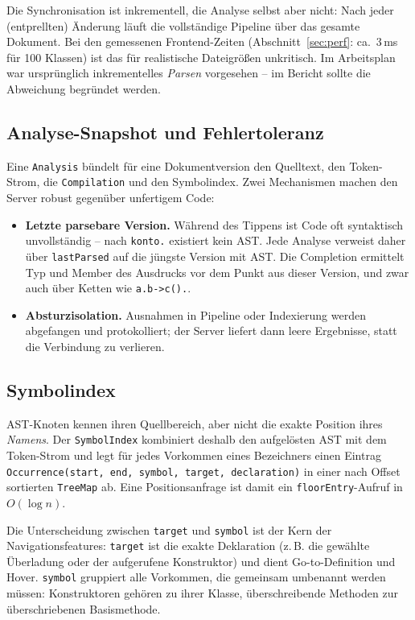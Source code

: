 \documentclass[11pt,a4paper,parskip=half,headsepline,toc=flat]{scrartcl}
\newcommand{\code}[1]{\texttt{#1}}
\begin{document}
\begin{hinweis}
Die Synchronisation ist inkrementell, die Analyse selbst aber nicht: Nach jeder (entprellten) Änderung läuft die
vollständige Pipeline über das gesamte Dokument. Bei den gemessenen Frontend-Zeiten (Abschnitt~\ref{sec:perf}:
ca.\ 3\,ms für 100 Klassen) ist das für realistische Dateigrößen unkritisch. Im Arbeitsplan war ursprünglich
inkrementelles \emph{Parsen} vorgesehen -- im Bericht sollte die Abweichung begründet werden.
\end{hinweis}

\subsection{Analyse-Snapshot und Fehlertoleranz}
Eine \code{Analysis} bündelt für eine Dokumentversion den Quelltext, den Token-Strom, die \code{Compilation} und den
Symbolindex. Zwei Mechanismen machen den Server robust gegenüber unfertigem Code:
\begin{itemize}
  \item \textbf{Letzte parsebare Version.} Während des Tippens ist Code oft syntaktisch unvollständig -- nach
    \code{konto.} existiert kein AST. Jede Analyse verweist daher über \code{lastParsed} auf die jüngste Version mit
    AST. Die Completion ermittelt Typ und Member des Ausdrucks vor dem Punkt aus dieser Version, und zwar auch über
    Ketten wie \code{a.b->c().}.
  \item \textbf{Absturzisolation.} Ausnahmen in Pipeline oder Indexierung werden abgefangen und protokolliert; der
    Server liefert dann leere Ergebnisse, statt die Verbindung zu verlieren.
\end{itemize}

\subsection{Symbolindex}
AST-Knoten kennen ihren Quellbereich, aber nicht die exakte Position ihres \emph{Namens}. Der \code{SymbolIndex}
kombiniert deshalb den aufgelösten AST mit dem Token-Strom und legt für jedes Vorkommen eines Bezeichners einen
Eintrag \code{Occurrence(start, end, symbol, target, declaration)} in einer nach Offset sortierten \code{TreeMap} ab.
Eine Positionsanfrage ist damit ein \code{floorEntry}-Aufruf in $O(\log n)$.

Die Unterscheidung zwischen \code{target} und \code{symbol} ist der Kern der Navigationsfeatures: \code{target} ist
die exakte Deklaration (z.\,B. die gewählte Überladung oder der aufgerufene Konstruktor) und dient Go-to-Definition
und Hover. \code{symbol} gruppiert alle Vorkommen, die gemeinsam umbenannt werden müssen: Konstruktoren gehören zu
ihrer Klasse, überschreibende Methoden zur überschriebenen Basismethode.
\end{document}

